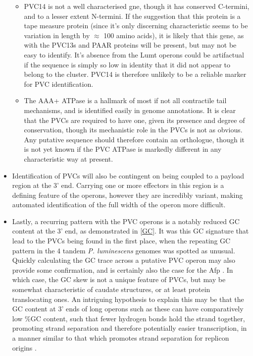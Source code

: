 \begin{itemize}
\begin{itemize}
	\item PVC14 is not a well characterised gne, though it has conserved C-termini, and to a lesser extent N-termini. If the suggestion that this protein is a tape measure protein (since it's only discerning characteristic seems to be variation in length by $\approx$ 100 amino acids), it is likely that this gene, as with the PVC13s and PAAR proteins will be present, but may not be easy to identify. It's absence from the Lumt operons could be artifactual if the sequence is simply so low in identity that it did not appear to belong to the cluster. PVC14 is therefore unlikely to be a reliable marker for PVC identification.
	\item The AAA+ ATPase is a hallmark of most if not all contractile tail mechanisms, and is identified easily in genome annotations. It is clear that the PVCs are required to have one, given its presence and degree of conservation, though its mechanistic role in the PVCs is not as obvious. Any putative sequence should therefore contain an orthologue, though it is not yet known if the PVC ATPase is markedly different in any characteristic way at present.
	\end{itemize}
\item Identification of PVCs will also be contingent on being coupled to a payload region at the 3' end. Carrying one or more effectors in this region is a defining feature of the operons, however they are incredibly variant, making automated identification of the full width of the operon more difficult.
\item Lastly, a recurring pattern with the PVC operons is a notably reduced GC content at the 3' end, as demonstrated in \vref{GC}. It was this GC signature that lead to the PVCs being found in the first place, when the repeating GC pattern in the 4 tandem \emph{P. luminescens} genomes was spotted as unusual. Quickly calculating the GC trace across a putative PVC operon may also provide some confirmation, and is certainly also the case for the Afp \citep{Hurst2004}. In which case, the GC skew is not a unique feature of PVCs, but may be somewhat characteristic of caudate structures, or at least protein translocating ones. An intriguing hypothesis to explain this may be that the GC content at 3' ends of long operons such as these can have comparatively low \%GC content, such that fewer hydrogen bonds hold the strand together, promoting strand separation and therefore potentially easier transcription, in a manner similar to that which promotes strand separation for replicon origins \citep{Artsimovitch2002}.
\end{itemize}

